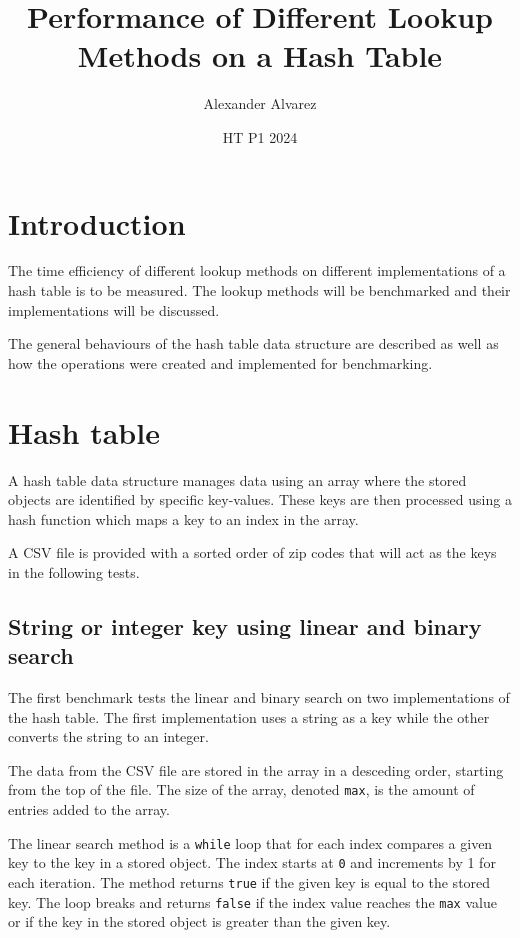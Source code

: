 \documentclass[a4paper,11pt]{article}
\begin{document}
\title{
  \textbf{Performance of Different Lookup Methods on a Hash Table}
}
\author{Alexander Alvarez}
\date{HT P1 2024}

\maketitle

\section*{Introduction}

The time efficiency of different lookup methods on different 
implementations of a hash table is to be measured. The lookup methods 
will be benchmarked and their implementations will be discussed.

The general behaviours of the hash table data structure are described 
as well as how the operations were created and implemented for 
benchmarking.

\section*{Hash table}

A hash table data structure manages data using an array where the 
stored objects are identified by specific key-values. These keys are 
then processed using a hash function which maps a key to an index in 
the array.

A CSV file is provided with a sorted order of zip codes that will act 
as the keys in the following tests.

\subsection*{String or integer key using linear and binary search}

The first benchmark tests the linear and binary search on two 
implementations of the hash table. The first implementation uses a 
string as a key while the other converts the string to an integer.

The data from the CSV file are stored in the array in a desceding
order, starting from the top of the file. The size of the array, 
denoted {\tt max}, is the amount of entries added to the array.

The linear search method is a {\tt while} loop that for each index 
compares a given key to the key in a stored object. The index starts 
at {\tt 0} and increments by 1 for each iteration. The method returns 
{\tt true} if the given key is equal to the stored key. The loop 
breaks and returns {\tt false} if the index value reaches the 
{\tt max} value or if the key in the stored object is greater than the 
given key.
\end{document}
